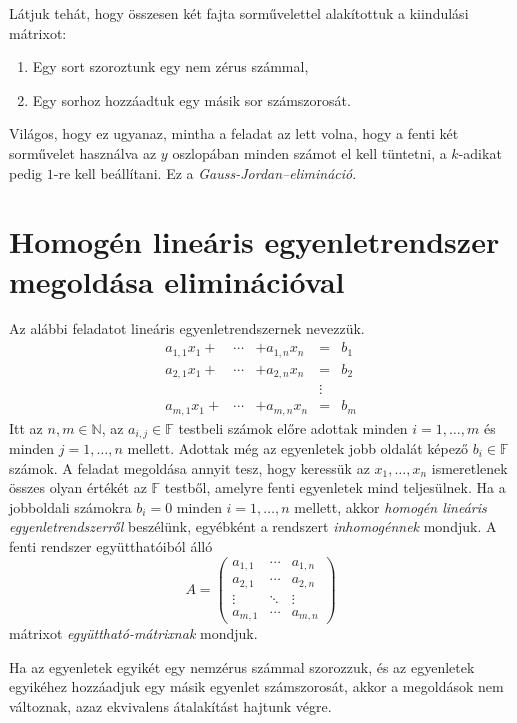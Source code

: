 \documentclass[9pt, showtrims]{memoir}
\theoremstyle{plain}
\theoremstyle{remark}
\theoremstyle{definition}
\begin{document}
Látjuk tehát, hogy összesen két fajta sorművelettel alakítottuk a kiindulási mátrixot:
\begin{enumerate}
    \item Egy sort szoroztunk egy nem zérus számmal,
    \item Egy sorhoz hozzáadtuk egy másik sor számszorosát.
\end{enumerate}
Világos, hogy ez ugyanaz, mintha a feladat az lett volna, 
hogy a fenti két sorművelet használva az $y$ oszlopában minden számot el kell tüntetni, 
a $k$-adikat pedig $1$-re kell beállítani.
Ez a \emph{Gauss-Jordan--elimináció}.

\section{Homogén lineáris egyenletrendszer megoldása eliminációval}
Az alábbi feladatot lineáris egyenletrendszernek nevezzük.
\[
\begin{array}{rrlcl}
    a_{1,1}x_1+&\cdots&+a_{1,n}x_n&=& b_1\\
    a_{2,1}x_1+&\cdots&+a_{2,n}x_n&=&b_2\\
    &&&\vdots&\\
    a_{m,1}x_1+&\cdots&+a_{m,n}x_n&=& b_m
\end{array}
\]
Itt az $n,m\in\mathbb{N}$, az $a_{i,j}\in\mathbb{F}$ testbeli számok előre adottak
minden $i=1,\dots,m$ és minden $j=1,\dots,n$ mellett.
Adottak még az egyenletek jobb oldalát képező $b_i\in\mathbb{F}$ számok.
A feladat megoldása annyit tesz, hogy keressük az $x_1,\dots,x_n$ ismeretlenek 
összes olyan értékét az $\mathbb{F}$ testből,
amelyre fenti egyenletek mind teljesülnek.
Ha a jobboldali számokra $b_i=0$ minden $i=1,\dots,n$ mellett,
akkor 
\emph{homogén lineáris egyenletrendszerről}%
beszélünk,
egyébként a rendszert
\emph{inhomogénnek}%
mondjuk.
A fenti rendszer együtthatóiból álló
\[
    A=
    \begin{pmatrix}
        a_{1,1}&\cdots&a_{1,n}\\
        a_{2,1}&\cdots&a_{2,n}\\
        \vdots&\ddots&\vdots\\
        a_{m,1}&\cdots&a_{m,n}
    \end{pmatrix}
\]
mátrixot 
\emph{együttható-mátrixnak}%
mondjuk.

Ha az egyenletek egyikét egy nemzérus számmal szorozzuk,
és az egyenletek egyikéhez hozzáadjuk egy másik egyenlet számszorosát,
akkor a megoldások nem változnak, 
azaz ekvivalens átalakítást hajtunk végre.
\end{document}
